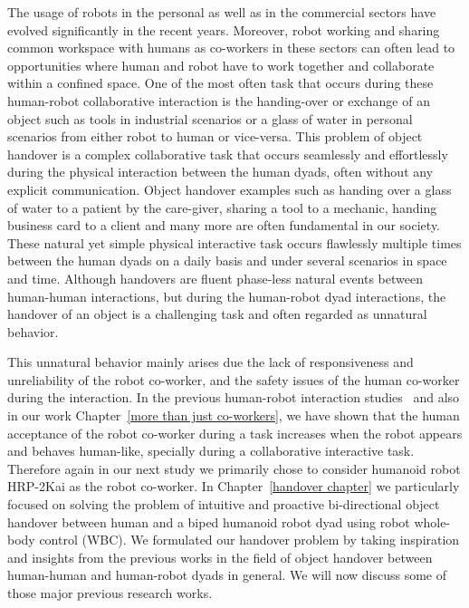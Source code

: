 The usage of robots in the personal as well as in the commercial sectors have evolved significantly in the recent years. Moreover, robot working and sharing common workspace with humans as co-workers in these sectors can often lead to opportunities where human and robot have to work together and collaborate within a confined space. One of the most often task that occurs during these human-robot collaborative interaction is the handing-over or exchange of an object such as tools in industrial scenarios or a glass of water in personal scenarios from either robot to human or vice-versa. This problem of object handover is a complex collaborative task that occurs seamlessly and effortlessly during the physical interaction between the human dyads, often without any explicit communication.  Object handover examples such as handing over a glass of water to a patient by the care-giver, sharing a tool to a mechanic, handing business card to a client and many more are often fundamental in our society. These natural yet simple physical interactive task occurs flawlessly multiple times between the human dyads on a daily basis and under several scenarios in space and time. Although handovers are fluent phase-less natural events between human-human interactions, but during the human-robot dyad interactions, the handover of an object is a challenging task and often regarded as unnatural behavior. 

This unnatural behavior mainly arises due the lack of responsiveness and unreliability of the robot co-worker, and the safety issues of the human co-worker during the interaction. In the previous human-robot interaction studies~\cite{huber2008human, strabala2013toward, shibata1995experimental} and also in our work Chapter~\ref{more than just co-workers}, we have shown that the human acceptance of the robot co-worker during a task increases when the robot appears and behaves human-like, specially during a collaborative interactive task. Therefore again in our next study we primarily chose to consider humanoid robot HRP-2Kai as the robot co-worker. In Chapter~\ref{handover chapter} we particularly focused on solving the problem of intuitive and proactive bi-directional object handover between human and a biped humanoid robot dyad using robot whole-body control (WBC). We formulated our handover problem by taking inspiration and insights from the previous works in the field of object handover between human-human and human-robot dyads in general. We will now discuss some of those major previous research works.

